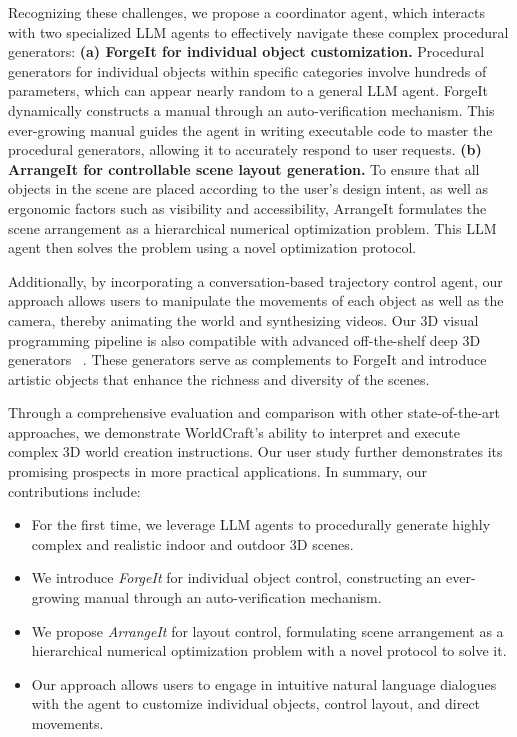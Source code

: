 Recognizing these challenges, we propose a coordinator agent, which interacts with two specialized LLM agents to effectively navigate these complex procedural generators:
\textbf{(a) ForgeIt for individual object customization.} Procedural generators for individual objects within specific categories involve hundreds of parameters, which can appear nearly random to a general LLM agent. ForgeIt dynamically constructs a manual through an auto-verification mechanism. This ever-growing manual guides the agent in writing executable code to master the procedural generators, allowing it to accurately respond to user requests.
%
\textbf{(b) ArrangeIt for controllable scene layout generation.} To ensure that all objects in the scene are placed according to the user's design intent, as well as ergonomic factors such as visibility and accessibility, ArrangeIt formulates the scene arrangement as a hierarchical numerical optimization problem. This LLM agent then solves the problem using a novel optimization protocol.




Additionally, by incorporating a conversation-based trajectory control agent, our approach allows users to manipulate the movements of each object as well as the camera, thereby animating the world and synthesizing videos. Our 3D visual programming pipeline is also compatible with advanced off-the-shelf deep 3D generators ~\cite{hong2023lrm, instant3d2023, zhang2024clay, siddiqui2024meta}. These generators serve as complements to ForgeIt and introduce artistic objects that enhance the richness and diversity of the scenes.


Through a comprehensive evaluation and comparison with other state-of-the-art approaches, we demonstrate WorldCraft’s ability to interpret and execute complex 3D world creation instructions. Our user study further demonstrates its promising prospects in more practical applications.
In summary, our contributions include:
\begin{itemize}
    \item For the first time, we leverage LLM agents to procedurally generate highly complex and realistic indoor and outdoor 3D scenes.
    \item We introduce \emph{ForgeIt} for individual object control, constructing an ever-growing manual through an auto-verification mechanism.
    \item We propose \emph{ArrangeIt} for layout control, formulating scene arrangement as a hierarchical numerical optimization problem with a novel protocol to solve it.
    \item Our approach allows users to engage in intuitive natural language dialogues with the agent to customize individual objects, control layout, and direct movements.
\end{itemize}

